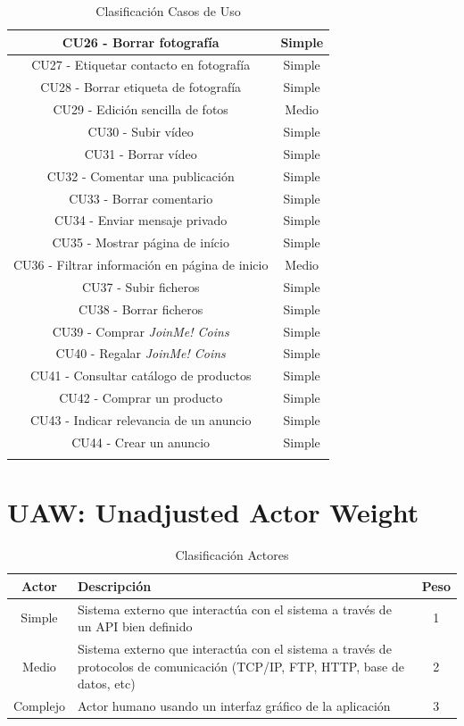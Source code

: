 \documentclass[12pt, a4paper, titlepage]{article}
\begin{document}
\begin{center}
\begin{longtable}{|c|c|}
			CU26 - Borrar fotografía & Simple \\ \hline
			CU27 - Etiquetar contacto en fotografía & Simple \\ \hline
			CU28 - Borrar etiqueta de fotografía & Simple \\ \hline
			CU29 - Edición sencilla de fotos & Medio \\ \hline
			CU30 - Subir vídeo & Simple \\ \hline
			CU31 - Borrar vídeo & Simple \\ \hline
			CU32 - Comentar una publicación & Simple \\ \hline
			CU33 - Borrar comentario & Simple \\ \hline
			CU34 - Enviar mensaje privado & Simple \\ \hline
			CU35 - Mostrar página de início & Simple \\ \hline
			CU36 - Filtrar información en página de inicio & Medio \\ \hline
			CU37 - Subir ficheros & Simple \\ \hline
			CU38 - Borrar ficheros & Simple \\ \hline
			CU39 - Comprar \textit{JoinMe! Coins} & Simple \\ \hline
			CU40 - Regalar \textit{JoinMe! Coins} & Simple \\ \hline
			CU41 - Consultar catálogo de productos & Simple \\ \hline
			CU42 - Comprar un producto & Simple \\ \hline
			CU43 - Indicar relevancia de un anuncio & Simple \\ \hline
			CU44 - Crear un anuncio & Simple \\ \hline
		
		\caption{Clasificación Casos de Uso} 
		\end{longtable}
		
	\end{center}



\section{UAW: Unadjusted Actor Weight}

\begin{table}[h]
	\begin{center}
		\begin{tabular}{|c|p{12cm}|c|}
	\hline
	Actor & Descripción  & Peso \\ \hline
	Simple & Sistema externo que interactúa con el sistema a través de un API bien definido & 1 \\ \hline
	Medio & Sistema externo que interactúa con el sistema a través de protocolos de comunicación (TCP/IP, FTP, HTTP, base de datos, etc)  & 2 \\ \hline
	Complejo & Actor humano usando un interfaz gráfico de la aplicación & 3 \\ \hline
	
	\end{tabular}
	\caption{Clasificación Actores}
	\end{center}
\end{table}
\end{document}
